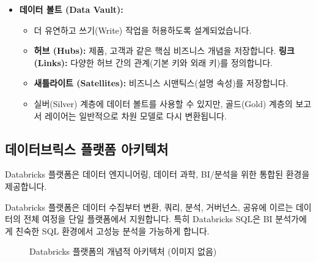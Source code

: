 \documentclass[11pt,a4paper]{article}
\theoremstyle{definition}
\begin{document}
\begin{itemize}
\begin{itemize}
        \item \textbf{데이터 볼트 (Data Vault):}
        \begin{itemize}
            \item 더 유연하고 쓰기(Write) 작업을 허용하도록 설계되었습니다.
            \item \textbf{허브 (Hubs):} 제품, 고객과 같은 핵심 비즈니스 개념을 저장합니다.
            \textbf{링크 (Links):} 다양한 허브 간의 관계(기본 키와 외래 키)를 정의합니다.
            \item \textbf{새틀라이트 (Satellites):} 비즈니스 시맨틱스(설명 속성)를 저장합니다.
            \item 실버(Silver) 계층에 데이터 볼트를 사용할 수 있지만, 골드(Gold) 계층의 보고서 레이어는 일반적으로 차원 모델로 다시 변환됩니다.
        \end{itemize}
    \end{itemize}
\end{itemize}

\subsection{데이터브릭스 플랫폼 아키텍처}
Databricks 플랫폼은 데이터 엔지니어링, 데이터 과학, BI/분석을 위한 통합된 환경을 제공합니다.

\begin{summarybox}[title=핵심 요약: 통합된 데이터 여정]
Databricks 플랫폼은 데이터 수집부터 변환, 쿼리, 분석, 거버넌스, 공유에 이르는 데이터의 전체 여정을 단일 플랫폼에서 지원합니다. 특히 Databricks SQL은 BI 분석가에게 친숙한 SQL 환경에서 고성능 분석을 가능하게 합니다.
\end{summarybox}

\begin{figure}[h!]
    \centering
    \caption{Databricks 플랫폼의 개념적 아키텍처 (이미지 없음)}
    \label{fig:databricks_architecture}
\end{figure}
\end{document}
